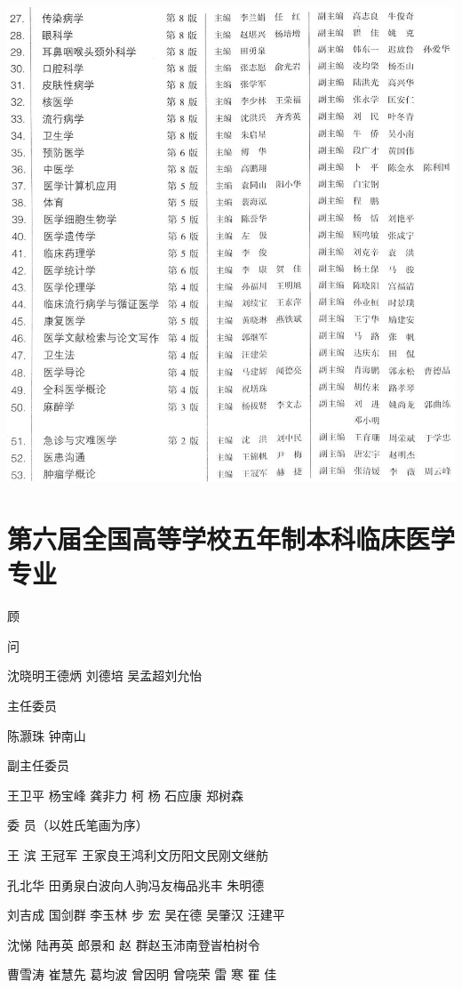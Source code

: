 \documentclass[10pt]{article}
\begin{document}
\begin{center}
\includegraphics[max width=\textwidth]{2024_07_09_002a177993bd97d1d6d7g-007}
\end{center}

\section*{第六届全国高等学校五年制本科临床医学专业}
顾

问

沈晓明王德炳 刘德培 吴孟超刘允怡

主任委员

陈灏珠 钟南山

副主任委员

王卫平 杨宝峰 龚非力 柯 杨 石应康 郑树森

委 员（以姓氏笔画为序）

王 滨 王冠军 王家良王鸿利文历阳文民刚文继舫

孔北华 田勇泉白波向人驹冯友梅品兆丰 朱明德

刘吉成 国剑群 李玉林 步 宏 吴在德 吴肇汉 汪建平

沈悌 陆再英 郎景和 赵 群赵玉沛南登峕柏树令

曹雪涛 崔慧先 葛均波 曾因明 曾哓荣 雷 寒 䍜 佳
\end{document}
